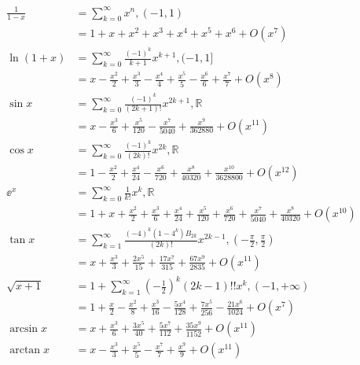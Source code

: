 \[
	\begin{aligned}
		\frac{1}{1-x} & = \sum_{k=0}^\infty x^n,(-1,1)                                                                                                                  \\
		              & = 1 + x + x^2 + x^3 + x^4 + x^5 + x^6 + O(x^7)                                                                                                  \\
		\ln(1+x)      & = \sum_{k=0}^\infty\frac{(-1)^k}{k+1}x^{k+1},(-1,1]                                                                                             \\
		              & = x - \frac{x^2}{2} + \frac{x^3}{3} - \frac{x^4}{4} + \frac{x^5}{5} - \frac{x^6}{6} + \frac{x^7}{7} + O(x^8)                                    \\
		\sin x        & = \sum_{k=0}^\infty \frac{(-1)^k}{(2k+1)!}x^{2k+1},\mathbb{R}                                                                                   \\
		              & = x - \frac{x^3}{6} + \frac{x^5}{120} - \frac{x^7}{5040} + \frac{x^9}{362880}+ O(x^{11})                                                        \\
		\cos x        & = \sum_{k=0}^\infty \frac{(-1)^k}{(2k)!}x^{2k},\mathbb{R}                                                                                       \\
		              & = 1 - \frac{x^2}{2} + \frac{x^4}{24} - \frac{x^6}{720} + \frac{x^8}{40320} + \frac{x^{10}}{3628800} + O(x^{12})                                 \\
		\ee^x         & = \sum_{k=0}^\infty\frac{1}{k!}x^k,\mathbb{R}                                                                                                   \\
		              & = 1 + x + \frac{x^2}{2} + \frac{x^3}{6} + \frac{x^4}{24} + \frac{x^5}{120} + \frac{x^6}{720} + \frac{x^7}{5040} + \frac{x^8}{40320} + O(x^{10}) \\
		\tan x        & = \sum_{k=1}^\infty \frac{(-4)^k(1-4^k)B_{2k}}{(2k)!}x^{2k-1},(-\frac{\pi}{2},\frac{\pi}{2})                                                    \\
		              & = x + \frac{x^3}{3} + \frac{2x^5}{15} + \frac{17x^{7}}{315} + \frac{67x^9}{2835} + O(x^{11})                                                    \\
		\sqrt{x+1}    & = 1 + \sum_{k=1}^\infty \left(-\frac{1}{2}\right)^k (2k-1)!!x^k,(-1, +\infty)                                                                   \\
		              & = 1 + \frac{x}{2}-\frac{x^2}{8} +\frac{x^3}{16}-\frac{5 x^4}{128} +\frac{7 x^5}{256}   - \frac{21x^6}{1024}   +  O(x^{7})                       \\
		\arcsin x     & = x + \frac{x^3}{6} + \frac{3x^5}{40} + \frac{5 x^7}{112} + \frac{35x^9}{1152}												+ O(x^{11})                                           \\
		\arctan x     & = x - \frac{x^3}{3} + \frac{x^5}{5} - \frac{x^7}{7}													 + \frac{x^9}{9}		  + O(x^{11})
	\end{aligned}
\]

